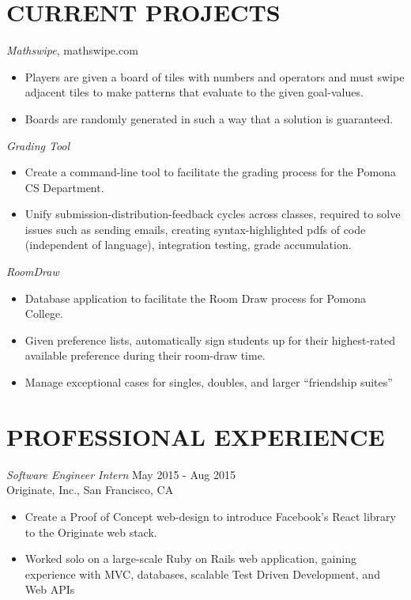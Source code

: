 \documentclass[margin, 10pt]{res} %
\begin{document}
\begin{resume}
\section{CURRENT PROJECTS}
{\sl Mathswipe}, mathswipe.com 
\begin{itemize} \itemsep -2pt %
\item Players are given a board of tiles with numbers and operators and must swipe adjacent tiles to make patterns that evaluate to the given goal-values.
\item Boards are randomly generated in such a way that a solution is guaranteed.
\end{itemize}

{\sl Grading Tool}
\begin{itemize} \itemsep -2pt %
\item Create a command-line tool to facilitate the grading process for the Pomona CS Department.
\item Unify submission-distribution-feedback cycles across classes, required to solve issues such as sending emails, creating syntax-highlighted pdfs of code (independent of language), integration testing, grade accumulation. 
\end{itemize}

{\sl RoomDraw}
\begin{itemize} \itemsep -2pt %
\item Database application to facilitate the Room Draw process for Pomona College.
\item Given preference lists, automatically sign students up for their highest-rated available preference during their room-draw time.
\item Manage exceptional cases for singles, doubles, and larger ``friendship suites''
\end{itemize}

 
\vspace{-0.5em}
\section{PROFESSIONAL EXPERIENCE}

{\sl Software Engineer Intern} \hfill May 2015 - Aug 2015 \\
Originate, Inc., San Francisco, CA
\begin{itemize} \itemsep -2pt %
\item Create a Proof of Concept web-design to introduce Facebook's React library to the Originate web stack.
\item Worked solo on a large-scale Ruby on Rails web application, gaining experience with MVC, databases, scalable Test Driven Development, and Web APIs
\end{itemize}


\end{resume}
\end{document}
